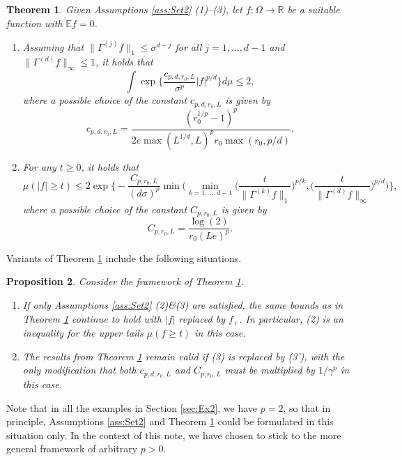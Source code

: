 \documentclass[a4paper,12pt]{amsart}
\numberwithin{equation}{section}
\newtheorem{satz}{Theorem}[section]
\newtheorem{proposition}[satz]{Proposition}
\theoremstyle{remark}
\def\E{{\mathbb E}}
\def\R{{\mathbb R}}
\begin{document}
\begin{satz}\label{thm:HigherOrder2}
	Given Assumptions \ref{ass:Set2} (1)--(3), let $f\colon \Omega \to \R$ be a suitable function with $\E f = 0$.
	\begin{enumerate}
		\item Assuming that $\lVert \Gamma^{(j)} f \rVert_1 \le \sigma^{d-j}$ for all $j=1,\ldots,d-1$ and $\lVert \Gamma^{(d)} f \rVert_\infty \le 1$, it holds that
		\[
		\int \exp\Big\{\frac{c_{p,d,r_0,L}}{\sigma^p} |f|^{p/d} \Big\} d\mu \le 2,
		\]
		where a possible choice of the constant $c_{p,d,r_0,L}$ is given by
		\[
		c_{p,d,r_0,L} = \frac{(r_0^{1/p}-1)^p}{2e\max(L^{1/d}, L)^pr_0\max(r_0,p/d)}.
		\]
		\item For any $t\ge 0$, it holds that
		\[
		\mu(|f| \ge t)\le
		2 \exp\Big\{- \frac{C_{p,r_0,L}}{(d\sigma)^p} \min\Big(\min_{k=1, \ldots,d-1} \Big(\frac{t}{\lVert \Gamma^{(k)} f \rVert_1}\Big)^{p/k}, \Big(\frac{t}{\lVert \Gamma^{(d)} f \rVert_\infty}\Big)^{p/d}\Big)\Big\},
		\]
		where a possible choice of the constant $C_{p,r_0,L}$ is given by
		\[
	    C_{p,r_0,L} = \frac{\log(2)}{r_0(Le)^p}.
		\]
	\end{enumerate}
\end{satz}

Variants of Theorem \ref{thm:HigherOrder2} include the following situations.

\begin{proposition}\label{prop:HigherOrder3}
Consider the framework of Theorem \ref{thm:HigherOrder2}.
\begin{enumerate}
\item If only Assumptions \ref{ass:Set2} (2)\&(3) are satisfied, the same bounds as in Theorem \ref{thm:HigherOrder2} continue to hold with $|f|$ replaced by $f_+$. In particular, (2) is an inequality for the upper tails $\mu(f\ge t)$ in this case.
\item The results from Theorem \ref{thm:HigherOrder2} remain valid if (3) is replaced by (3'), with the only modification that both $c_{p,d,r_0,L}$ and $C_{p,r_0,L}$ must be multiplied by $1/\gamma^p$ in this case.
\end{enumerate}
\end{proposition}

Note that in all the examples in Section \ref{sec:Ex2}, we have $p=2$, so that in principle, Assumptions \ref{ass:Set2} and Theorem \ref{thm:HigherOrder2} could be formulated in this situation only. In the context of this note, we have chosen to stick to the more general framework of arbitrary $p > 0$.
\end{document}
